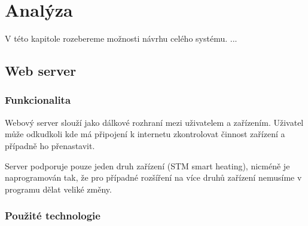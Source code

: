 \chapter{Analýza}

V této kapitole rozebereme možnosti návrhu celého systému.
...

\section{Web server}

\subsection{Funkcionalita}
Webový server slouží jako dálkové rozhraní mezi uživatelem a zařízením.
Uživatel může odkudkoli kde má připojení k internetu zkontrolovat činnost zařízení
a případně ho přenastavit.

Server podporuje pouze jeden druh zařízení (STM smart heating), nicméně je naprogramován
tak, že pro případné rozšíření na více druhů zařízení nemusíme v programu dělat veliké
změny.

\subsection{Použité technologie}


